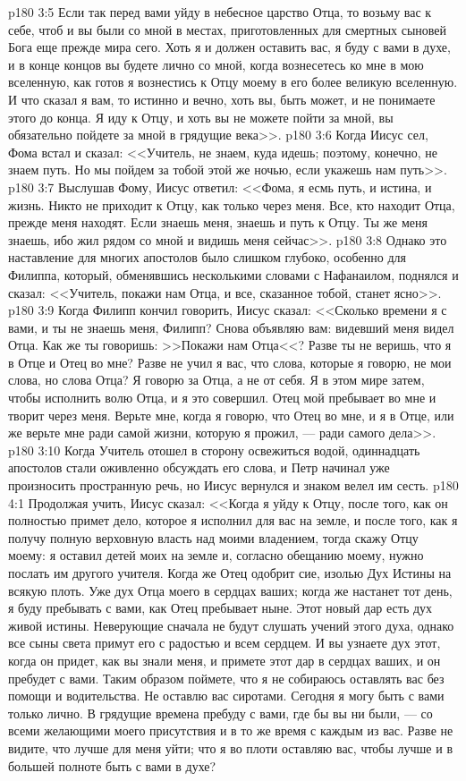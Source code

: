\vs p180 3:5 Если так перед вами уйду в небесное царство Отца, то возьму вас к себе, чтоб и вы были со мной в местах, приготовленных для смертных сыновей Бога еще прежде мира сего. Хоть я и должен оставить вас, я буду с вами в духе, и в конце концов вы будете лично со мной, когда вознесетесь ко мне в мою вселенную, как готов я вознестись к Отцу моему в его более великую вселенную. И что сказал я вам, то истинно и вечно, хоть вы, быть может, и не понимаете этого до конца. Я иду к Отцу, и хоть вы не можете пойти за мной, вы обязательно пойдете за мной в грядущие века>>.
\vs p180 3:6 Когда Иисус сел, Фома встал и сказал: <<Учитель, не знаем, куда идешь; поэтому, конечно, не знаем путь. Но мы пойдем за тобой этой же ночью, если укажешь нам путь>>.
\vs p180 3:7 Выслушав Фому, Иисус ответил: <<Фома, я есмь путь, и истина, и жизнь. Никто не приходит к Отцу, как только через меня. Все, кто находит Отца, прежде меня находят. Если знаешь меня, знаешь и путь к Отцу. Ты же меня знаешь, ибо жил рядом со мной и видишь меня сейчас>>.
\vs p180 3:8 Однако это наставление для многих апостолов было слишком глубоко, особенно для Филиппа, который, обменявшись несколькими словами с Нафанаилом, поднялся и сказал: <<Учитель, покажи нам Отца, и все, сказанное тобой, станет ясно>>.
\vs p180 3:9 Когда Филипп кончил говорить, Иисус сказал: <<Сколько времени я с вами, и ты не знаешь меня, Филипп? Снова объявляю вам: видевший меня видел Отца. Как же ты говоришь: >>Покажи нам Отца<<? Разве ты не веришь, что я в Отце и Отец во мне? Разве не учил я вас, что слова, которые я говорю, не мои слова, но слова Отца? Я говорю за Отца, а не от себя. Я в этом мире затем, чтобы исполнить волю Отца, и я это совершил. Отец мой пребывает во мне и творит через меня. Верьте мне, когда я говорю, что Отец во мне, и я в Отце, или же верьте мне ради самой жизни, которую я прожил, --- ради самого дела>>.
\vs p180 3:10 Когда Учитель отошел в сторону освежиться водой, одиннадцать апостолов стали оживленно обсуждать его слова, и Петр начинал уже произносить пространную речь, но Иисус вернулся и знаком велел им сесть.
\vs p180 4:1 Продолжая учить, Иисус сказал: <<Когда я уйду к Отцу, после того, как он полностью примет дело, которое я исполнил для вас на земле, и после того, как я получу полную верховную власть над моими владением, тогда скажу Отцу моему: я оставил детей моих на земле и, согласно обещанию моему, нужно послать им другого учителя. Когда же Отец одобрит сие, изолью Дух Истины на всякую плоть. Уже дух Отца моего в сердцах ваших; когда же настанет тот день, я буду пребывать с вами, как Отец пребывает ныне. Этот новый дар есть дух живой истины. Неверующие сначала не будут слушать учений этого духа, однако все сыны света примут его с радостью и всем сердцем. И вы узнаете дух этот, когда он придет, как вы знали меня, и примете этот дар в сердцах ваших, и он пребудет с вами. Таким образом поймете, что я не собираюсь оставлять вас без помощи и водительства. Не оставлю вас сиротами. Сегодня я могу быть с вами только лично. В грядущие времена пребуду с вами, где бы вы ни были, --- со всеми желающими моего присутствия и в то же время с каждым из вас. Разве не видите, что лучше для меня уйти; что я во плоти оставляю вас, чтобы лучше и в большей полноте быть с вами в духе?
